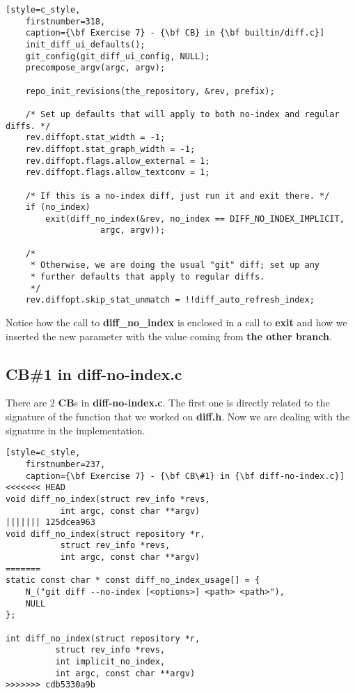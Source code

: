 \begin{lstlisting}[style=c_style,
	firstnumber=318,
	caption={\bf Exercise 7} - {\bf CB} in {\bf builtin/diff.c}]
	init_diff_ui_defaults();
	git_config(git_diff_ui_config, NULL);
	precompose_argv(argc, argv);

	repo_init_revisions(the_repository, &rev, prefix);

	/* Set up defaults that will apply to both no-index and regular diffs. */
	rev.diffopt.stat_width = -1;
	rev.diffopt.stat_graph_width = -1;
	rev.diffopt.flags.allow_external = 1;
	rev.diffopt.flags.allow_textconv = 1;

	/* If this is a no-index diff, just run it and exit there. */
	if (no_index)
		exit(diff_no_index(&rev, no_index == DIFF_NO_INDEX_IMPLICIT,
				   argc, argv));

	/*
	 * Otherwise, we are doing the usual "git" diff; set up any
	 * further defaults that apply to regular diffs.
	 */
	rev.diffopt.skip_stat_unmatch = !!diff_auto_refresh_index;
\end{lstlisting}

Notice how the call to {\bf diff\_no\_index} is enclosed in a call to {\bf exit} and how we inserted
the new parameter with the value coming from {\bf the other branch}.


\subsection*{CB\#1 in diff-no-index.c}

There are 2 {\bf CB}s in {\bf diff-no-index.c}. The first one is directly related to the signature of the function that
we worked on {\bf diff.h}. Now we are dealing with the signature in the implementation.

\begin{lstlisting}[style=c_style,
	firstnumber=237,
	caption={\bf Exercise 7} - {\bf CB\#1} in {\bf diff-no-index.c}]
<<<<<<< HEAD
void diff_no_index(struct rev_info *revs,
		   int argc, const char **argv)
||||||| 125dcea963
void diff_no_index(struct repository *r,
		   struct rev_info *revs,
		   int argc, const char **argv)
=======
static const char * const diff_no_index_usage[] = {
	N_("git diff --no-index [<options>] <path> <path>"),
	NULL
};

int diff_no_index(struct repository *r,
		  struct rev_info *revs,
		  int implicit_no_index,
		  int argc, const char **argv)
>>>>>>> cdb5330a9b
\end{lstlisting}

